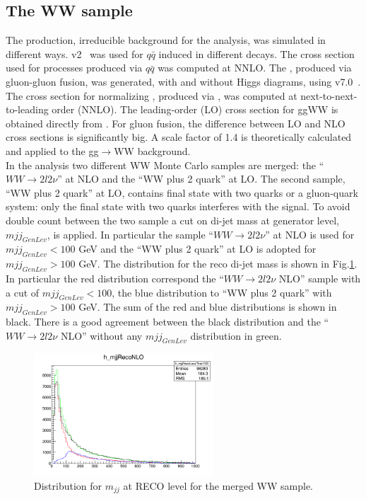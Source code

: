 \subsection*{The WW sample} The \WW production, irreducible background for the analysis, was simulated in different ways. 
\POWHEG v2~\cite{Melia:2011tj} was used for $q\bar{q}$  induced \WW in different decays. 
The cross section used for \WW processes produced via $q\bar{q}$ was computed at NNLO. 
The \WW, produced via gluon-gluon fusion, was generated, with and without Higgs diagrams, using \MCFM v7.0~\cite{Campbell:2013wga}. 
The cross section for normalizing \WW,  produced via \qqbar, was computed at next-to-next-to-leading order
(NNLO). The leading-order (LO) cross section for ggWW is obtained directly from \MCFM.
For gluon fusion, the difference between LO and NLO cross sections is significantly big.
A scale factor of 1.4 is theoretically calculated~\cite{Aaboud:2018jqu} and applied to the gg$\to$WW background. \\
In the analysis two different WW Monte Carlo samples are merged: the ``$WW \rightarrow 2l 2\nu$'' at NLO and the ``WW plus 2 quark'' at LO.  
The second sample,  ``WW plus 2 quark'' at LO, contains  final state with two quarks or a gluon-quark system: only the final state with two quarks interferes with the signal.
To avoid double count between the two sample a cut on di-jet mass at generator level, $mjj_{GenLev}$, is applied. 
In particular the sample ``$WW \rightarrow 2l 2\nu$'' at NLO is used for $mjj_{GenLev} <100$ GeV and the ``WW plus 2 quark'' at LO is adopted for $mjj_{GenLev} >100$ GeV.
The  distribution for the reco di-jet mass is shown in Fig.\ref{fig:WW}. In particular the red distribution correspond the ``$WW \rightarrow 2l 2\nu$ NLO'' sample with a cut of  $mjj_{GenLev} <100$, the blue distribution to  ``WW plus 2 quark'' with $mjj_{GenLev} >100$ GeV. The sum of the red and blue distributions is shown in black. There is a good agreement between  the black distribution and the ``$WW \rightarrow 2l 2\nu$ NLO'' without any  $mjj_{GenLev}$ distribution  in green.
\begin{figure}[htbp]
\centering
\includegraphics[width=0.6\textwidth]{../AN/Figs/WW_distribution}
\caption{ Distribution for $m_{jj}$ at RECO level for the merged WW sample.}
    \label{fig:WW}
\end{figure}




